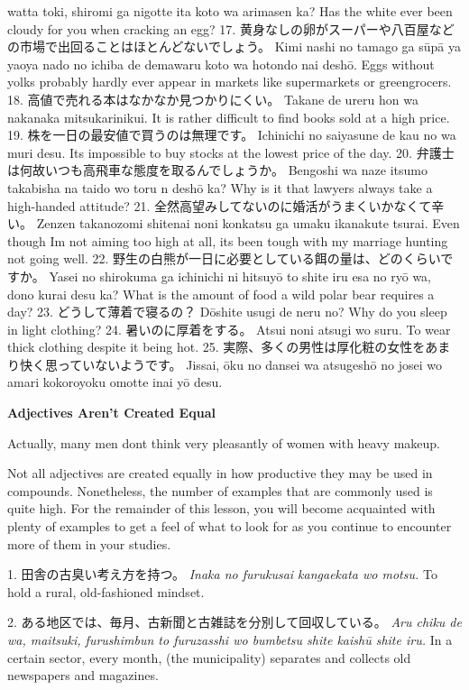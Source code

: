 watta toki, shiromi ga nigotte ita koto wa arimasen ka? Has the white ever been cloudy for you when cracking an egg? 17. 黄身なしの卵がスーパーや八百屋などの市場で出回ることはほとんどないでしょう。 Kimi nashi no tamago ga sūpā ya yaoya nado no ichiba de demawaru koto wa hotondo nai deshō. Eggs without yolks probably hardly ever appear in markets like supermarkets or greengrocers. 18. 高値で売れる本はなかなか見つかりにくい。 Takane de ureru hon wa nakanaka mitsukarinikui. It is rather difficult to find books sold at a high price. 19. 株を一日の最安値で買うのは無理です。 Ichinichi no saiyasune de kau no wa muri desu. It\textquotesingle s impossible to buy stocks at the lowest price of the day. 20. 弁護士は何故いつも高飛車な態度を取るんでしょうか。 Bengoshi wa naze itsumo takabisha na taido wo toru n deshō ka? Why is it that lawyers always take a high-handed attitude? 21. 全然高望みしてないのに婚活がうまくいかなくて辛い。 Zenzen takanozomi shitenai noni konkatsu ga umaku ikanakute tsurai. Even though I\textquotesingle m not aiming too high at all, it\textquotesingle s been tough with my marriage hunting not going well. 22. 野生の白熊が一日に必要としている餌の量は、どのくらいですか。 Yasei no shirokuma ga ichinichi ni hitsuyō to shite iru esa no ryō wa, dono kurai desu ka? What is the amount of food a wild polar bear requires a day? 23. どうして薄着で寝るの？ Dōshite usugi de neru no? Why do you sleep in light clothing? 24. 暑いのに厚着をする。 Atsui noni atsugi wo suru. To wear thick clothing despite it being hot. 25. 実際、多くの男性は厚化粧の女性をあまり快く思っていないようです。 Jissai, ōku no dansei wa atsugeshō no josei wo amari kokoroyoku omotte inai yō desu. 
\begin{center}
\textbf{Adjectives Aren't Created Equal }
\end{center}
Actually, many men don\textquotesingle t think very pleasantly of women with heavy makeup. 
\par{ Not all adjectives are created equally in how productive they may be used in compounds. Nonetheless, the number of examples that are commonly used is quite high. For the remainder of this lesson, you will become acquainted with plenty of examples to get a feel of what to look for as you continue to encounter more of them in your studies. }

\par{1. 田舎の古臭い考え方を持つ。 \hfill\break
 \emph{Inaka no furukusai kangaekata wo motsu. \hfill\break
}To hold a rural, old-fashioned mindset. }
 
\par{2. ある地区では、毎月、古新聞と古雑誌を分別して回収している。 \hfill\break
 \emph{Aru chiku de wa, maitsuki, furushimbun to furuzasshi wo bumbetsu shite kaishū shite iru. }\hfill\break
In a certain sector, every month, (the municipality) separates and collects old newspapers and magazines. }
 
